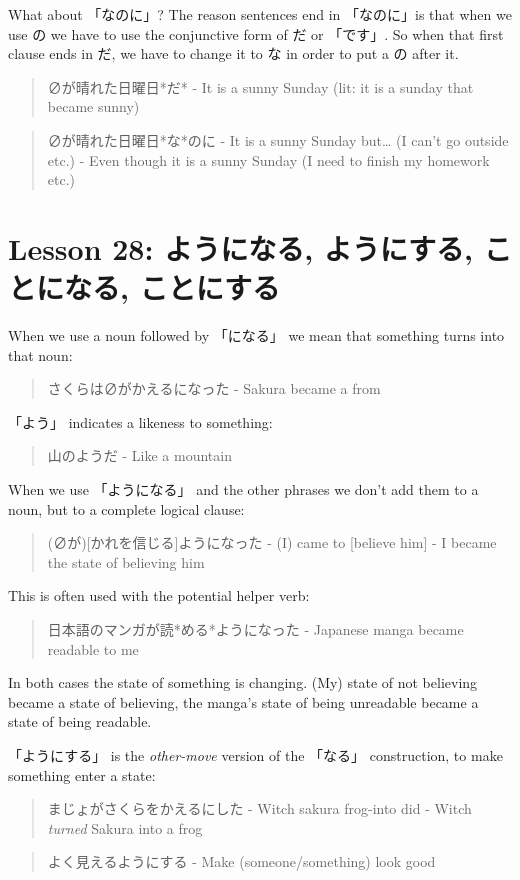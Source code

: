 \documentclass[11pt]{article}
\begin{document}
What about 「なのに」? The reason sentences end in 「なのに」is that when we use の we have to use the conjunctive form of だ or 「です」. So when that first clause ends in だ, we have to change it to な in order to put a の after it.
\begin{quote}
∅が晴れた日曜日*だ* - It is a sunny Sunday (lit: it is a sunday that became sunny)
\end{quote}
\begin{quote}
∅が晴れた日曜日*な*のに - It is a sunny Sunday but\ldots{} (I can't go outside etc.) - Even though it is a sunny Sunday (I need to finish my homework etc.)
\end{quote}
\section{Lesson 28: ようになる, ようにする, ことになる, ことにする}
\label{sec:orgfa338c7}
When we use a noun followed by 「になる」 we mean that something turns into that noun:
\begin{quote}
さくらは∅がかえるになった - Sakura became a from
\end{quote}

「よう」 indicates a likeness to something:
\begin{quote}
山のようだ - Like a mountain
\end{quote}

When we use 「ようになる」 and the other phrases we don't add them to a noun, but to a complete logical clause:
\begin{quote}
(∅が)[かれを信じる]ようになった - (I) came to [believe him] - I became the state of believing him
\end{quote}

This is often used with the potential helper verb:
\begin{quote}
日本語のマンガが読*める*ようになった - Japanese manga became readable to me
\end{quote}

In both cases the state of something is changing. (My) state of not believing became a state of believing, the manga's state of being unreadable became a state of being readable.

「ようにする」 is the \emph{other-move} version of the 「なる」 construction, to make something enter a state:
\begin{quote}
まじょがさくらをかえるにした - Witch sakura frog-into did - Witch \emph{turned} Sakura into a frog
\end{quote}
\begin{quote}
よく見えるようにする - Make (someone/something) look good
\end{quote}
\end{document}
